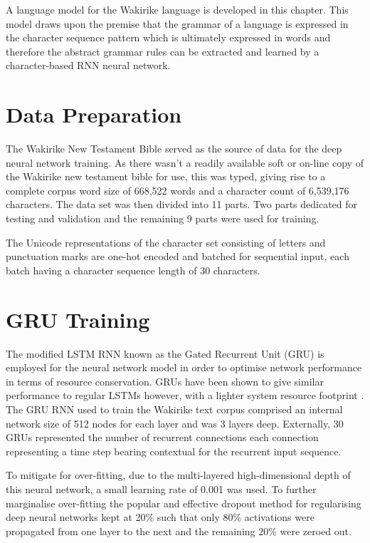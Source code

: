 A language model for the Wakirike language is developed in this chapter.  This model draws upon the premise that the grammar of a language is expressed in the character sequence pattern which is ultimately expressed in words and therefore the abstract grammar rules can be extracted and learned by a character-based RNN neural network.

\section{Data Preparation}
The Wakirike New Testament Bible served as the source of data for the deep neural network training.  As there wasn't a readily available soft or on-line copy of the Wakirike new testament bible for use, this was typed, giving rise to a complete corpus word size of 668,522 words and a character count of 6,539,176 characters. The data set was then divided into 11 parts. Two parts dedicated for testing and validation and the remaining 9 parts were used for training.

The Unicode representations of the character set consisting of letters and punctuation marks are one-hot encoded and batched for sequential input, each batch having a character sequence length of 30 characters.


\section{GRU Training}

The modified LSTM RNN known as the Gated Recurrent Unit (GRU) is employed for the neural network model in order to optimise network performance in terms of resource conservation.  GRUs have been shown to give similar performance to regular LSTMs however, with a lighter system resource footprint \citep{cho2014learning}. The GRU RNN used to train the Wakirike text corpus comprised an internal network size of 512 nodes for each layer and was 3 layers deep. Externally, 30 GRUs represented  the number of recurrent connections each connection representing a time step bearing contextual for the recurrent input sequence. 

To mitigate for over-fitting, due to the multi-layered high-dimensional depth of this neural network, a small learning rate of 0.001 was used. To further marginalise over-fitting the popular and effective dropout \citep{srivastava2014dropout} method for regularising deep neural networks kept at 20\% such that only 80\% activations were propagated from one layer to the next and the remaining 20\% were zeroed out.

